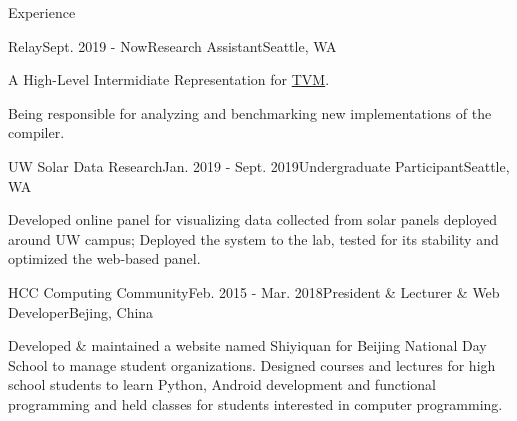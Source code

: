 \documentclass{resume}
\begin{document}
	\begin{rSection}{Experience}



		\begin{rSubsection}{Relay}{Sept. 2019 - Now}{Research Assistant}{Seattle, WA}
			\item A High-Level Intermidiate Representation for \href{https://tvm.ai/}{TVM}.
			\item Being responsible for analyzing and benchmarking new implementations of the compiler.
		\end{rSubsection}
		\vspace{-5pt}


		\begin{rSubsection}{UW Solar Data Research}{Jan. 2019 - Sept. 2019}{Undergraduate Participant}{Seattle, WA}
			\item Developed online panel for visualizing data collected from solar panels deployed around UW campus; Deployed the system to the lab, tested for its stability and optimized the web-based panel.
		\end{rSubsection}
		\vspace{-5pt}


		\begin{rSubsection}{HCC Computing Community}{Feb. 2015 - Mar. 2018}{President \& Lecturer \& Web Developer}{Bejing, China}
			\item Developed \& maintained a website named Shiyiquan for Beijing National Day School to manage student organizations. Designed courses and lectures for high school students to learn Python, Android development and functional programming and held classes for students interested in computer programming.
		\end{rSubsection}
		\vspace{-5pt}
	\end{rSection}
	\vspace{-5pt}
\end{document}
